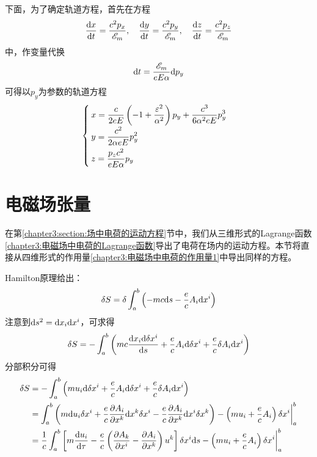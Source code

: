 \begin{solution}
下面，为了确定轨道方程，首先在方程
\begin{equation}
	\frac{\mathrm{d} x}{\mathrm{d} t} = \frac{c^2p_x}{\mathscr{E}_m},\quad \frac{\mathrm{d} y}{\mathrm{d} t} = \frac{c^2p_y}{\mathscr{E}_m},\quad \frac{\mathrm{d} z}{\mathrm{d} t} = \frac{c^2p_z}{\mathscr{E}_m}
\end{equation}
中，作变量代换
\begin{equation*}
	\mathrm{d} t = \frac{\mathscr{E}_m}{eE\alpha}\mathrm{d} p_y
\end{equation*}
可得以$p_y$为参数的轨道方程
\begin{equation}
\begin{cases}
	\displaystyle x = \frac{c}{2eE}\left(-1+\frac{\varepsilon^2}{\alpha^2}\right)p_y + \frac{c^3}{6\alpha^2eE}p_y^3 \\[1.5ex]
	\displaystyle y = \frac{c^2}{2\alpha eE}p_y^2 \\[1.5ex]
	\displaystyle z = \frac{p_zc^2}{eE\alpha}p_y
\end{cases}
\end{equation}
\end{solution}

\section{电磁场张量}

在第\ref{chapter3:section:场中电荷的运动方程}节中，我们从三维形式的Lagrange函数\eqref{chapter3:电磁场中电荷的Lagrange函数}导出了电荷在场内的运动方程。本节将直接从四维形式的作用量\eqref{chapter3:电磁场中电荷的作用量1}中导出同样的方程。

Hamilton原理给出：
\begin{equation}
	\delta S = \delta \int_a^b \left(-mc\mathrm{d} s-\frac{e}{c}A_i\mathrm{d} x^i\right)
	\label{chapter3:电磁场张量-电磁场的Hamilton原理1}
\end{equation}
注意到$\mathrm{d} s^2 = \mathrm{d} x_i\mathrm{d} x^i$，可求得
\begin{equation*}
	\delta S = -\int_a^b \left(mc\frac{\mathrm{d} x_i\mathrm{d} \delta x^i}{\mathrm{d} s} + \frac{e}{c}A_i\mathrm{d} \delta x^i + \frac{e}{c}\delta A_i\mathrm{d} x^i\right)
\end{equation*}
分部积分可得
\begin{align}
	\delta S & = -\int_a^b \left(mu_i\mathrm{d} \delta x^i + \frac{e}{c}A_i\mathrm{d} \delta x^i + \frac{e}{c}\delta A_i\mathrm{d} x^i\right) \nonumber \\
	& = \int_a^b \left(m\mathrm{d} u_i \delta x^i + \frac{e}{c}\frac{\partial A_i}{\partial x^k}\mathrm{d} x^k\delta x^i - \frac{e}{c} \frac{\partial A_i}{\partial x^k}\mathrm{d} x^i \delta x^k\right) - \left(mu_i+\frac{e}{c}A_i\right)\delta x^i\bigg|_a^b \nonumber \\
	& = \frac1c \int_a^b \left[m\frac{\mathrm{d} u_i}{\mathrm{d} \tau} - \frac{e}{c}\left(\frac{\partial A_k}{\partial x^i} - \frac{\partial A_i}{\partial x^k}\right) u^k\right] \delta x^i\mathrm{d} s - \left(mu_i+\frac{e}{c}A_i\right)\delta x^i\bigg|_a^b
	\label{chapter3:电磁场张量-电磁场的Hamilton原理2}
\end{align}

